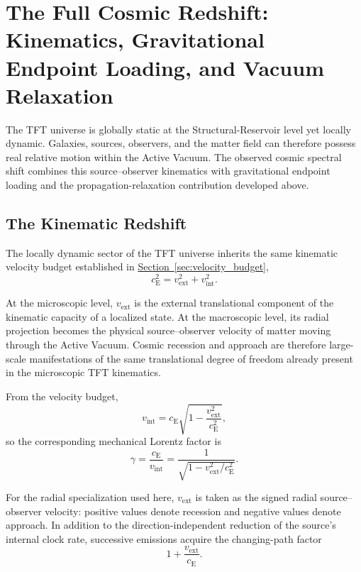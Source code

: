 \section{The Full Cosmic Redshift: Kinematics, Gravitational Endpoint Loading, and Vacuum Relaxation}

The TFT universe is globally static at the Structural-Reservoir level yet locally dynamic. Galaxies, sources, observers, and the matter field can therefore possess real relative motion within the Active Vacuum. The observed cosmic spectral shift combines this source--observer kinematics with gravitational endpoint loading and the propagation-relaxation contribution developed above.


\subsection{The Kinematic Redshift}

The locally dynamic sector of the TFT universe inherits the same kinematic velocity budget established in
\hyperref[sec:velocity_budget]{Section~\ref*{sec:velocity_budget}},
\begin{equation}
    c_{\mathrm E}^2
    =
    v_{\mathrm{ext}}^2
    +
    v_{\mathrm{int}}^2.
\end{equation}

At the microscopic level, $v_{\mathrm{ext}}$ is the external translational component of the kinematic capacity of a localized state. At the macroscopic level, its radial projection becomes the physical source--observer velocity of matter moving through the Active Vacuum. Cosmic recession and approach are therefore large-scale manifestations of the same translational degree of freedom already present in the microscopic TFT kinematics.

From the velocity budget,
\begin{equation}
    v_{\mathrm{int}}
    =
    c_{\mathrm E}
    \sqrt{
        1-
        \frac{v_{\mathrm{ext}}^2}
        {c_{\mathrm E}^2}
    },
\end{equation}
so the corresponding mechanical Lorentz factor is
\begin{equation}
    \gamma
    =
    \frac{c_{\mathrm E}}{v_{\mathrm{int}}}
    =
    \frac{1}{
        \sqrt{
            1-v_{\mathrm{ext}}^2/c_{\mathrm E}^2
        }
    }.
\end{equation}

For the radial specialization used here, $v_{\mathrm{ext}}$ is taken as the signed radial source--observer velocity: positive values denote recession and negative values denote approach. In addition to the direction-independent reduction of the source's internal clock rate, successive emissions acquire the changing-path factor
\begin{equation}
    1+\frac{v_{\mathrm{ext}}}{c_{\mathrm E}}.
\end{equation}

